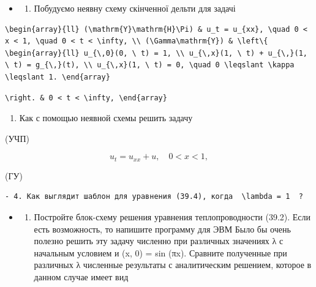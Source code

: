 \documentclass[
  ukrainian,
]{article}
\providecommand{\tightlist}{%
  \setlength{\itemsep}{0pt}\setlength{\parskip}{0pt}}
\begin{document}
\begin{itemize}
\tightlist
\item
  \begin{enumerate}
  \def\labelenumi{\arabic{enumi}.}
  \setcounter{enumi}{1}
  \tightlist
  \item
    Побудуємо неявну схему скінченної дельти для задачі
  \end{enumerate}
\end{itemize}

\begin{verbatim}
\begin{array}{ll} (\mathrm{Y}\mathrm{H}\Pi) & u_t = u_{xx}, \quad 0 < x < 1, \quad 0 < t < \infty, \\ (\Gamma\mathrm{Y}) & \left\{ \begin{array}{ll} u_{\,0}(0, \ t) = 1, \\ u_{\,x}(1, \ t) + u_{\,}(1, \ t) = g_{\,}(t), \\ u_{\,x}(1, \ t) = 0, \quad 0 \leqslant \kappa \leqslant 1. \end{array}
\end{verbatim}

\begin{verbatim}
\right. & 0 < t < \infty, \end{array}
\end{verbatim}

\begin{enumerate}
\def\labelenumi{\arabic{enumi}.}
\setcounter{enumi}{2}
\tightlist
\item
  Как с помощью неявной схемы решить задачу
\end{enumerate}

(УЧП)

\[
u_t = u_{xx} + u, \quad 0 < x < 1,
\]

(ГУ)

\begin{verbatim}
- 4. Как выглядит шаблон для уравнения (39.4), когда  \lambda = 1  ?
\end{verbatim}

\begin{itemize}
\tightlist
\item
  \begin{enumerate}
  \def\labelenumi{\arabic{enumi}.}
  \setcounter{enumi}{4}
  \tightlist
  \item
    Постройте блок-схему решения уравнения теплопроводности (39.2). Если
    есть возможность, то напишите программу для ЭВМ Было бы очень
    полезно решить эту задачу численно при различных значениях λ с
    начальным условием и (x, 0) = sin (πx). Сравните полученные при
    различных λ численные результаты с аналитическим решением, которое в
    данном случае имеет вид
  \end{enumerate}
\end{itemize}
\end{document}
